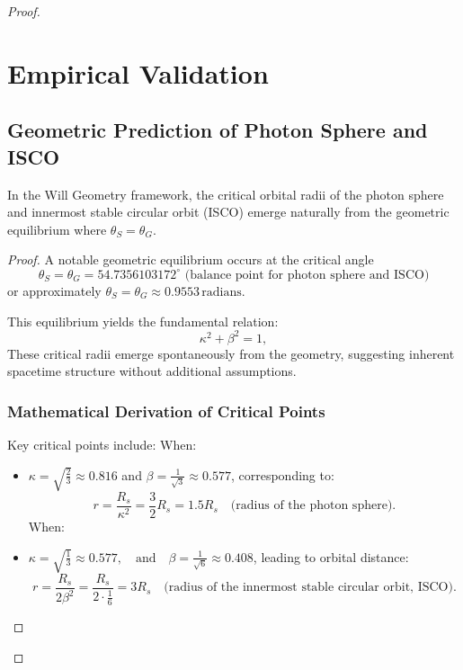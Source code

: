 \documentclass{article}
\begin{document}
\begin{proof}
\section{Empirical Validation}


\subsection{Geometric Prediction of Photon Sphere and ISCO}

\begin{theorem}
In the Will Geometry framework, the critical orbital radii of the photon sphere and innermost stable circular orbit (ISCO) emerge naturally from the geometric equilibrium where $\theta_S = \theta_G$.
\end{theorem}
\begin{proof}
A notable geometric equilibrium occurs at the critical angle 
\begin{equation}
    \theta_S = \theta_G= 54.7356103172^{\circ} \text{ (balance point for photon sphere and ISCO)}
\end{equation}
or approximately $\theta_S = \theta_G \approx 0.9553\,\text{radians}$.

This equilibrium yields the fundamental relation:
\begin{equation}
\kappa^2 + \beta^2 = 1,
\end{equation}
These critical radii emerge spontaneously from the geometry, suggesting inherent spacetime structure without additional assumptions.

\subsubsection{Mathematical Derivation of Critical Points}

Key critical points include:
When:
\begin{itemize}
    \item \(\kappa = \sqrt{\frac{2}{3}} \approx 0.816\) and \(\beta = \frac{1}{\sqrt{3}} \approx 0.577\), corresponding to:
    \[
    r = \frac{R_s}{\kappa^2} =\frac{3}{2}R_s = 1.5R_s \quad \text{(radius of the photon sphere)}.
    \]
    When:
    \item      \( \kappa=\sqrt{\frac{1}{3}}\approx 0.577, \quad \text{and} \quad  \beta = \frac{1}{\sqrt{6}} \approx 0.408\), leading to orbital distance:
    \[
    r = \frac{R_s}{2\beta^2} = \frac{R_s}{2 \cdot \frac{1}{6}} = 3R_s \quad \text{(radius of the innermost stable circular orbit, ISCO)}.
    \]
\end{itemize}


\end{proof}
\end{proof}
\end{document}
